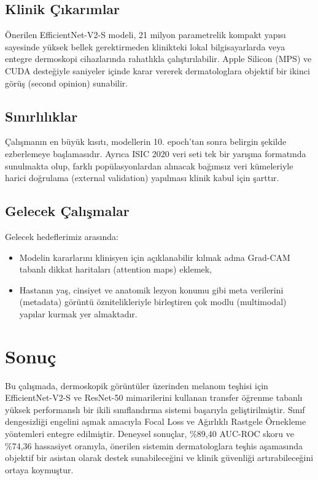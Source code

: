 \documentclass[12pt,a4paper]{article}
\begin{document}
\subsection{Klinik Çıkarımlar}
Önerilen EfficientNet-V2-S modeli, 21 milyon parametrelik kompakt yapısı sayesinde yüksek bellek gerektirmeden klinikteki lokal bilgisayarlarda veya entegre dermoskopi cihazlarında rahatlıkla çalıştırılabilir. Apple Silicon (MPS) ve CUDA desteğiyle saniyeler içinde karar vererek dermatologlara objektif bir ikinci görüş (second opinion) sunabilir.

\subsection{Sınırlılıklar}
Çalışmanın en büyük kısıtı, modellerin 10. epoch'tan sonra belirgin şekilde ezberlemeye başlamasıdır. Ayrıca ISIC 2020 veri seti tek bir yarışma formatında sunulmakta olup, farklı popülasyonlardan alınacak bağımsız veri kümeleriyle harici doğrulama (external validation) yapılması klinik kabul için şarttır.

\subsection{Gelecek Çalışmalar}
Gelecek hedeflerimiz arasında:
\begin{itemize}
    \item Modelin kararlarını klinisyen için açıklanabilir kılmak adına Grad-CAM tabanlı dikkat haritaları (attention maps) eklemek,
    \item Hastanın yaş, cinsiyet ve anatomik lezyon konumu gibi meta verilerini (metadata) görüntü öznitelikleriyle birleştiren çok modlu (multimodal) yapılar kurmak yer almaktadır.
\end{itemize}

\section{Sonuç}
\label{sec:sonuc}

Bu çalışmada, dermoskopik görüntüler üzerinden melanom teşhisi için EfficientNet-V2-S ve ResNet-50 mimarilerini kullanan transfer öğrenme tabanlı yüksek performanslı bir ikili sınıflandırma sistemi başarıyla geliştirilmiştir. Sınıf dengesizliği engelini aşmak amacıyla Focal Loss ve Ağırlıklı Rastgele Örnekleme yöntemleri entegre edilmiştir. Deneysel sonuçlar, \%89,40 AUC-ROC skoru ve \%74,36 hassasiyet oranıyla, önerilen sistemin dermatologlara teşhis aşamasında objektif bir asistan olarak destek sunabileceğini ve klinik güvenliği artırabileceğini ortaya koymuştur.
\end{document}
